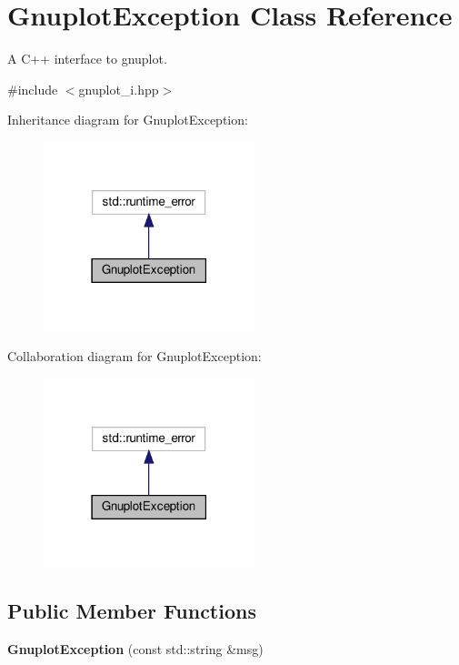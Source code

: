 \hypertarget{classGnuplotException}{}\section{Gnuplot\+Exception Class Reference}
\label{classGnuplotException}


A C++ interface to gnuplot.  




{\ttfamily \#include $<$gnuplot\+\_\+i.\+hpp$>$}



Inheritance diagram for Gnuplot\+Exception\+:\nopagebreak
\begin{figure}[H]
\begin{center}
\leavevmode
\includegraphics[width=174pt]{classGnuplotException__inherit__graph}
\end{center}
\end{figure}


Collaboration diagram for Gnuplot\+Exception\+:\nopagebreak
\begin{figure}[H]
\begin{center}
\leavevmode
\includegraphics[width=174pt]{classGnuplotException__coll__graph}
\end{center}
\end{figure}
\subsection*{Public Member Functions}
\begin{DoxyCompactItemize}
\item 
\mbox{\label{classGnuplotException_a8b324a9ef4d3f75079d41ecd61c62d44}} 
{\bfseries Gnuplot\+Exception} (const std\+::string \&msg)
\end{DoxyCompactItemize}


